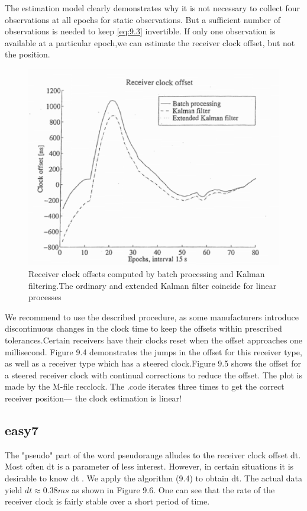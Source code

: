 	The estimation model clearly demonstrates why it is not necessary to collect four observations at all epochs for static observations. But a sufficient number of observations is needed to keep \ref{eq:9.3} invertible. If only one observation is available at a particular epoch,we can estimate the receiver clock offset, but not the position.
	\begin{figure}
	\centering
	\includegraphics[width=0.7\linewidth]{TeX_files/Part03/chapter09/image/9-5}
	\caption{Receiver clock offsets computed by batch processing and Kalman filtering.The ordinary and extended Kalman filter coincide for linear processes}
	\label{fig:9-5}
	\end{figure}

	We recommend to use the described procedure, as some manufacturers introduce discontinuous changes in the clock time to keep the offsets within prescribed tolerances.Certain receivers have their clocks reset when the offset approaches one millisecond. Figure 9.4 demonstrates the jumps in the offset for this receiver type, as well as a receiver type which has a steered clock.Figure 9.5 shows the offset for a steered receiver clock with continual corrections to reduce the offset. The plot is made by the M-file recclock. The .code iterates three times to get the correct receiver position— the clock estimation is linear!
	
	\subsection{easy7}\label{subsec:easy7}
	
	The "pseudo" part of the word pseudorange alludes to the receiver clock offset dt. Most often dt is a parameter of less interest. However, in certain situations it is desirable to know dt . We apply the algorithm (9.4) to obtain dt. The actual data yield $dt\approx0.38 ms$ as shown in Figure 9.6. One can see that the rate of the receiver clock is fairly stable over a short period of time.
